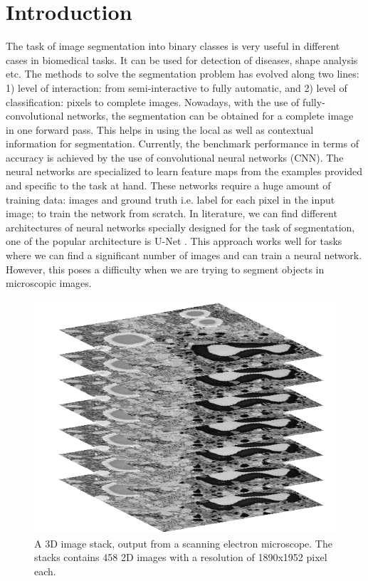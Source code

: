 %


\chapter{Introduction}


The task of image segmentation into binary classes is very useful in different cases in biomedical tasks. It can be used for detection of diseases, shape analysis etc. The methods to solve the segmentation problem has evolved along two lines: 1) level of interaction: from semi-interactive to fully automatic, and 2) level of classification: pixels to complete images. Nowadays, with the use of fully-convolutional networks, the segmentation can be obtained for a complete image in one forward pass. This helps in using the local as well as contextual information for segmentation. Currently, the benchmark performance in terms of accuracy is achieved by the use of convolutional neural networks (CNN). The neural networks are specialized to learn feature maps from the examples provided and specific to the task at hand. These networks require a huge amount of training data: images and ground truth i.e. label for each pixel in the input image; to train the network from scratch. In literature, we can find different architectures of neural networks specially designed for the task of segmentation, one of the popular architecture is U-Net \cite{unet}. This approach works well for tasks where we can find a significant number of images and can train a neural network. However, this poses a difficulty when we are trying to segment objects in microscopic images.

\begin{figure}[h!] \label{fig:3dstack}
\centering
 \includegraphics[width=0.8\linewidth]{figures/3d_stack.png}
\caption{A 3D image stack, output from a scanning electron microscope.
The stacks contains 458 2D images with a resolution of 1890x1952 pixel each.}
\end{figure}

